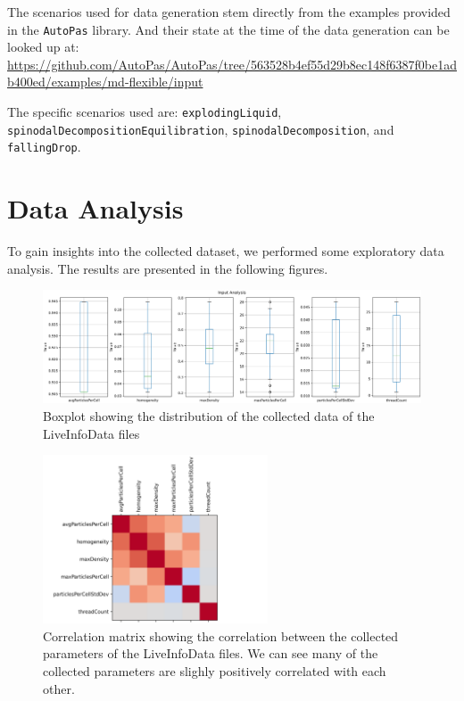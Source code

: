 The scenarios used for data generation stem directly from the examples provided in the \texttt{AutoPas} library. And their state at the time of the data generation can be looked up at: \small{
  \url{
    https://github.com/AutoPas/AutoPas/tree/563528b4ef55d29b8ec148f6387f0be1adb400ed/examples/md-flexible/input
  }
}

The specific scenarios used are: \texttt{explodingLiquid}, \texttt{spinodalDecompositionEquilibration}, \texttt{spinodalDecomposition}, and \texttt{fallingDrop}.


\section{Data Analysis}

To gain insights into the collected dataset, we performed some exploratory data analysis. The results are presented in the following figures.

\begin{figure}[H]
  \centering
  \includegraphics[width=\columnwidth,trim={0 0 0 0.5cm},clip]{figures/DataAnalytics/input_analysis.png}
  \caption[Boxplot of the collected Dataset]{Boxplot showing the distribution of the collected data of the LiveInfoData files}
  \label{fig:inputAnalysisBoxplot}
\end{figure}

\begin{figure}[H]
  \centering
  \includegraphics[height=5cm,trim={0cm 0 2cm 0cm},clip]{figures/DataAnalytics/correlation_matrix.png}
  \caption[Correlation Matrix of the collected Dataset]{Correlation matrix showing the correlation between the collected parameters of the LiveInfoData files. We can see many of the collected parameters are slighly positively correlated with each other.}
  \label{fig:corrMatrix}
\end{figure}

